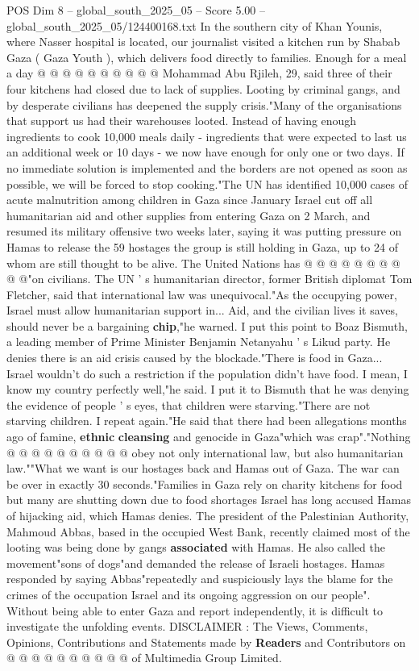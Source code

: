 \begin{textsample}{POS Dim 8 – global\_south\_2025\_05 – Score 5.00 – global\_south\_2025\_05/124400168.txt}
In the southern city of Khan Younis, where Nasser hospital is located, our journalist visited a kitchen run by Shabab Gaza ( Gaza Youth ), which delivers food directly to families.
Enough for a meal a day @ @ @ @ @ @ @ @ @ @ Mohammad Abu Rjileh, 29, said three of their four kitchens had closed due to lack of supplies.
Looting by criminal gangs, and by desperate civilians has deepened the supply crisis."Many of the organisations that support us had their warehouses looted.
Instead of having enough ingredients to cook 10,000 meals daily - ingredients that were expected to last us an additional week or 10 days - we now have enough for only one or two days.
If no immediate solution is implemented and the borders are not opened as soon as possible, we will be forced to stop cooking."The UN has identified 10,000 cases of acute malnutrition among children in Gaza since January Israel cut off all humanitarian aid and other supplies from entering Gaza on 2 March, and resumed its military offensive two weeks later, saying it was putting pressure on Hamas to release the 59 hostages the group is still holding in Gaza, up to 24 of whom are still thought to be alive.
The United Nations has @ @ @ @ @ @ @ @ @ @"on civilians.
The UN ' s humanitarian director, former British diplomat Tom Fletcher, said that international law was unequivocal."As the occupying power, Israel must allow humanitarian support in...
Aid, and the civilian lives it saves, should never be a bargaining \textbf{chip},"he warned.
I put this point to Boaz Bismuth, a leading member of Prime Minister Benjamin Netanyahu ' s Likud party.
He denies there is an aid crisis caused by the blockade."There is food in Gaza...
Israel wouldn't do such a restriction if the population didn't have food.
I mean, I know my country perfectly well,"he said.
I put it to Bismuth that he was denying the evidence of people ' s eyes, that children were starving."There are not starving children.
I repeat again."He said that there had been allegations months ago of famine, \textbf{ethnic} \textbf{cleansing} and genocide in Gaza"which was crap"."Nothing @ @ @ @ @ @ @ @ @ @ obey not only international law, but also humanitarian law.""What we want is our hostages back and Hamas out of Gaza.
The war can be over in exactly 30 seconds."Families in Gaza rely on charity kitchens for food but many are shutting down due to food shortages Israel has long accused Hamas of hijacking aid, which Hamas denies.
The president of the Palestinian Authority, Mahmoud Abbas, based in the occupied West Bank, recently claimed most of the looting was being done by gangs \textbf{associated} with Hamas.
He also called the movement"sons of dogs"and demanded the release of Israeli hostages.
Hamas responded by saying Abbas"repeatedly and suspiciously lays the blame for the crimes of the occupation Israel and its ongoing aggression on our people".
Without being able to enter Gaza and report independently, it is difficult to investigate the unfolding events.
DISCLAIMER : The Views, Comments, Opinions, Contributions and Statements made by \textbf{Readers} and Contributors on @ @ @ @ @ @ @ @ @ @ of Multimedia Group Limited.

\end{textsample}
